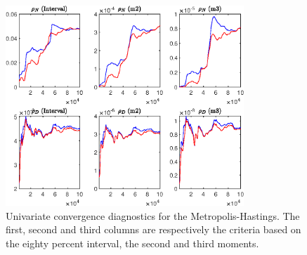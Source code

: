 \begin{figure}[H]
\centering 
\includegraphics[width=0.80\textwidth]{BRS_growth_util/Output/BRS_growth_util_udiag5}
\caption{Univariate convergence diagnostics for the Metropolis-Hastings.
The first, second and third columns are respectively the criteria based on
the eighty percent interval, the second and third moments.}\label{Fig:UnivariateDiagnostics:5}
\end{figure}

